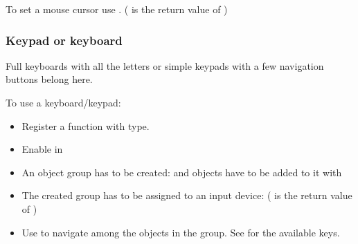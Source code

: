 \documentclass[letterpaper,10pt,english]{sphinxmanual}
\begin{document}
To set a mouse cursor use . ( is the return value of )


\subsubsection{Keypad or keyboard}
\label{\detokenize{porting/indev:keypad-or-keyboard}}
Full keyboards with all the letters or simple keypads with a few navigation buttons belong here.

To use a keyboard/keypad:
\begin{itemize}
\item {} 
Register a  function with  type.

\item {} 
Enable  in 

\item {} 
An object group has to be created:   and objects have to be added to it with 

\item {} 
The created group has to be assigned to an input device:  ( is the return value of )

\item {} 
Use  to navigate among the objects in the group. See  for the available keys.

\end{itemize}
\end{document}
